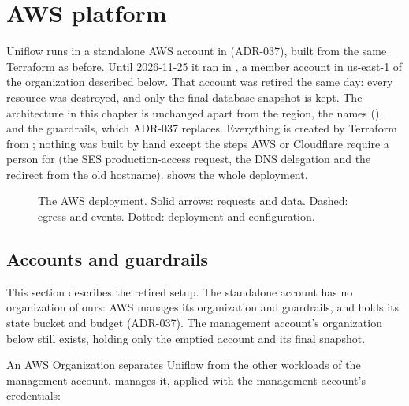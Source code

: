 \chapter{AWS platform}\label{ch:aws}

Uniflow runs in a standalone AWS account in  (ADR-037), built from the
same Terraform as before. Until 2026-11-25 it ran in , a member account in
us-east-1 of the organization described below. That account was retired the same day: every
resource was destroyed, and only the final database snapshot  is kept. The
architecture in this chapter is unchanged apart from the region, the names (), and
the guardrails, which ADR-037 replaces. Everything is created by Terraform from ;
nothing was built by hand except the steps AWS or Cloudflare require a person for (the SES
production-access request, the DNS delegation and the redirect from the old hostname).
 shows the whole deployment.

\begin{figure}[p]
  \centering
  \makebox[\linewidth][c]{}
  \caption{The AWS deployment. Solid arrows: requests and data. Dashed: egress and events.
    Dotted: deployment and configuration.}
  \label{fig:aws}
\end{figure}

\section{Accounts and guardrails}\label{sec:aws-guardrails}
This section describes the retired  setup. The standalone account has no
organization of ours: AWS manages its organization and guardrails, and 
holds its state bucket and budget (ADR-037). The management account's organization below still
exists, holding only the emptied  account and its final snapshot.

An AWS Organization separates Uniflow from the other workloads of the management account.
 manages it, applied with the management account's credentials:

